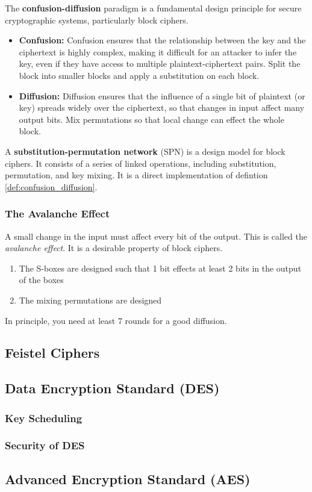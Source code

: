 \begin{defn}
    The \textbf{confusion-diffusion} paradigm  is a fundamental design principle for secure cryptographic systems, particularly block ciphers.
    \begin{itemize}
        \item \textbf{Confusion:} Confusion ensures that the relationship between the key and the ciphertext is highly complex, making it difficult for an attacker to infer the key, even if they have access to multiple plaintext-ciphertext pairs. Split the block into smaller blocks and apply a
        substitution on each block.
        \item \textbf{Diffusion:} Diffusion ensures that the influence of a single bit of plaintext (or key) spreads widely over the ciphertext, so that changes in input affect many output bits.  Mix permutations so that local change can effect the
        whole block.
    \end{itemize}
\end{defn} \label{def:confusion_diffusion}

\begin{defn}
    A \textbf{substitution-permutation network} (SPN) is a design model for block ciphers. It consists of a series of linked operations, including substitution, permutation, and key mixing. It is a direct implementation of defintion \ref{def:confusion_diffusion}.
\end{defn}




\subsubsection{The Avalanche Effect}
A small change in the input must affect every bit of the output. This is called the \emph{avalanche effect}. It is a desirable property of block ciphers.
\begin{enumerate}
    \item The S-boxes are designed such that 1 bit effects at least 2 bits in the output of the boxes
    \item The mixing permutations are designed
\end{enumerate}

In principle, you need at least 7 rounds for a good diffusion. 

\subsection{Feistel Ciphers}

\subsection{Data Encryption Standard (DES)}

\subsubsection{Key Scheduling}

\subsubsection{Security of DES}

\subsection{Advanced Encryption Standard (AES)}